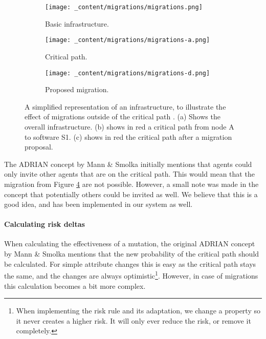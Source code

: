 \begin{figure}[H]
    \begin{subfigure}[b]{0.3\textwidth}
        \centering
        \texttt{[image: \_content/migrations/migrations.png]}
        \caption{Basic infrastructure.}
        \label{fig:migrations-outside-infrastructure}
    \end{subfigure}
    \begin{subfigure}[b]{0.3\textwidth}
        \centering
        \texttt{[image: \_content/migrations/migrations-a.png]}
        \caption{Critical path.}
        \label{fig:migrations-outside-attack}
    \end{subfigure}
    \begin{subfigure}[b]{0.3\textwidth}
        \centering
        \texttt{[image: \_content/migrations/migrations-d.png]}
        \caption{Proposed migration.}
        \label{fig:migrations-outside-proposal}
    \end{subfigure}
    \caption{A simplified representation of an infrastructure, to illustrate the effect of migrations outside of the critical path . (a) Shows the overall infrastructure. (b) shows in red a critical path from node A to software S1. (c) shows in red the critical path after a migration proposal.}
    \label{fig:migrations-outside}
\end{figure}

The ADRIAN concept by Mann \& Smolka \cite{mann2023ADRIAN} initially mentions that agents could only invite other agents that are on the critical path. This would mean that the migration from Figure \ref{fig:migrations-outside} are not possible. However, a small note was made in the concept that potentially others could be invited as well. We believe that this is a good idea, and has been implemented in our system as well.

\paragraph*{Calculating risk deltas}
When calculating the effectiveness of a mutation, the original ADRIAN concept by Mann \& Smolka \cite{mann2023ADRIAN} mentions that the new probability of the critical path should be calculated. For simple attribute changes this is easy as the critical path stays the same, and the changes are always optimistic\footnote{When implementing the risk rule and its adaptation, we change a property so it never creates a higher risk. It will only ever reduce the risk, or remove it completely.}. However, in case of migrations this calculation becomes a bit more complex. 

